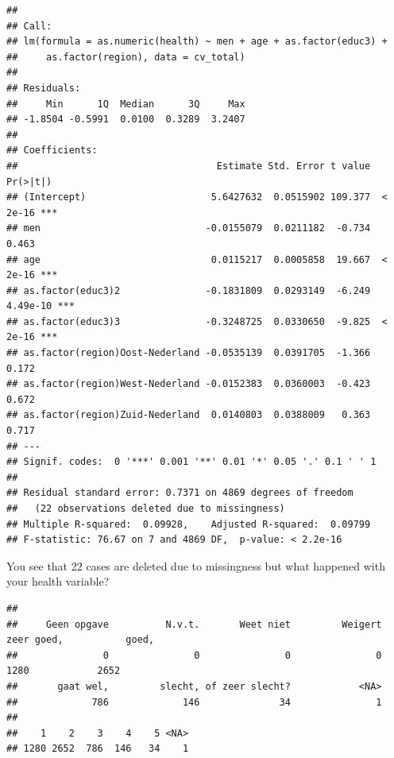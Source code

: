 \documentclass[
]{book}
\newenvironment{Shaded}{\begin{snugshade}}{\end{snugshade}}
\newcommand{\DataTypeTok}[1]{\textcolor[rgb]{0.13,0.29,0.53}{#1}}
\newcommand{\DecValTok}[1]{\textcolor[rgb]{0.00,0.00,0.81}{#1}}
\newcommand{\KeywordTok}[1]{\textcolor[rgb]{0.13,0.29,0.53}{\textbf{#1}}}
\newcommand{\NormalTok}[1]{#1}
\newcommand{\OperatorTok}[1]{\textcolor[rgb]{0.81,0.36,0.00}{\textbf{#1}}}
\newcommand{\OtherTok}[1]{\textcolor[rgb]{0.56,0.35,0.01}{#1}}
\newcommand{\StringTok}[1]{\textcolor[rgb]{0.31,0.60,0.02}{#1}}
\begin{document}
\begin{verbatim}
## 
## Call:
## lm(formula = as.numeric(health) ~ men + age + as.factor(educ3) + 
##     as.factor(region), data = cv_total)
## 
## Residuals:
##     Min      1Q  Median      3Q     Max 
## -1.8504 -0.5991  0.0100  0.3289  3.2407 
## 
## Coefficients:
##                                   Estimate Std. Error t value Pr(>|t|)    
## (Intercept)                      5.6427632  0.0515902 109.377  < 2e-16 ***
## men                             -0.0155079  0.0211182  -0.734    0.463    
## age                              0.0115217  0.0005858  19.667  < 2e-16 ***
## as.factor(educ3)2               -0.1831809  0.0293149  -6.249 4.49e-10 ***
## as.factor(educ3)3               -0.3248725  0.0330650  -9.825  < 2e-16 ***
## as.factor(region)Oost-Nederland -0.0535139  0.0391705  -1.366    0.172    
## as.factor(region)West-Nederland -0.0152383  0.0360003  -0.423    0.672    
## as.factor(region)Zuid-Nederland  0.0140803  0.0388009   0.363    0.717    
## ---
## Signif. codes:  0 '***' 0.001 '**' 0.01 '*' 0.05 '.' 0.1 ' ' 1
## 
## Residual standard error: 0.7371 on 4869 degrees of freedom
##   (22 observations deleted due to missingness)
## Multiple R-squared:  0.09928,    Adjusted R-squared:  0.09799 
## F-statistic: 76.67 on 7 and 4869 DF,  p-value: < 2.2e-16
\end{verbatim}

You see that 22 cases are deleted due to missingness but what happened with your health variable?

\begin{Shaded}
\end{Shaded}

\begin{verbatim}
## 
##     Geen opgave          N.v.t.       Weet niet         Weigert      zeer goed,           goed, 
##               0               0               0               0            1280            2652 
##       gaat wel,         slecht, of zeer slecht?            <NA> 
##             786             146              34               1 
## 
##    1    2    3    4    5 <NA> 
## 1280 2652  786  146   34    1
\end{verbatim}
\end{document}
